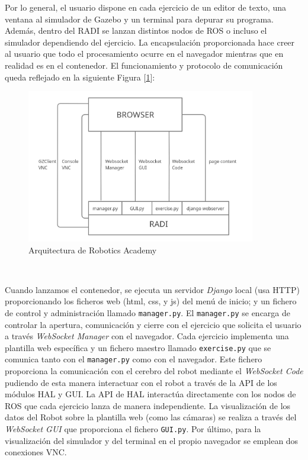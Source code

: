 Por lo general, el usuario dispone en cada ejercicio de un editor de texto, una ventana al simulador de Gazebo y un terminal para depurar su programa. Además, dentro del RADI se lanzan distintos nodos de ROS o incluso el simulador dependiendo del ejercicio. La encapsulación proporcionada hace creer al usuario que todo el procesamiento ocurre en el navegador mientras que en realidad es en el contenedor. El funcionamiento y protocolo de comunicación queda reflejado en la siguiente Figura [\ref{fig:arquitectura_robotics_academy}]:\\

\begin{figure} [H]
  \begin{center}
    \includegraphics[width=10cm]{imagenes/cap3/robotics_academy_architecture.png}
  \end{center}
  \caption{Arquitectura de Robotics Academy}
  \label{fig:arquitectura_robotics_academy}
\end{figure}\

Cuando lanzamos el contenedor, se ejecuta un servidor \textit{Django} local (usa HTTP) proporcionando los ficheros web (html, css, y js) del menú de inicio; y un fichero de control y administración llamado \texttt{manager.py}. El \texttt{manager.py} se encarga de controlar la apertura, comunicación y cierre con el ejercicio que solicita el usuario a través \textit{WebSocket Manager} con el navegador. Cada ejercicio implementa una plantilla web específica y un fichero maestro llamado \texttt{exercise.py} que se comunica tanto con el \texttt{manager.py} como con el navegador. Este fichero proporciona la comunicación con el cerebro del robot mediante el \textit{WebSocket Code} pudiendo de esta manera interactuar con el robot a través de la API de los módulos HAL y GUI. La API de HAL interactúa directamente con los nodos de ROS que cada ejercicio lanza de manera independiente. La visualización de los datos del Robot sobre la plantilla web (como las cámaras) se realiza a través del \textit{WebSocket GUI} que proporciona el fichero \texttt{GUI.py}. Por último, para la visualización del simulador y del terminal en el propio navegador se emplean dos conexiones VNC.\\

